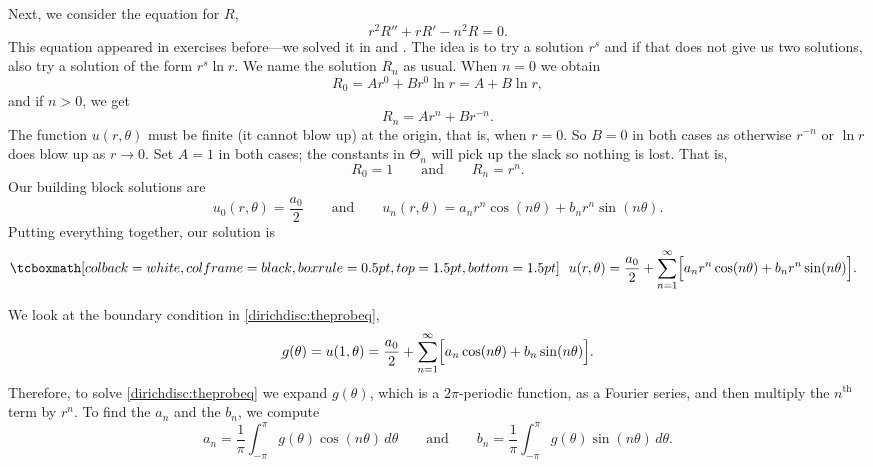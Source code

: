 Next, we consider the equation for $R$,
\begin{equation*}
r^2 R'' + r R' - n^2 R = 0.
\end{equation*}
This equation appeared in exercises before---we
solved it in 
and .  The idea is to try a solution
$r^s$ and if that does not give us two solutions, also try a solution of the form
$r^s \ln r$.  We name the solution $R_n$ as usual.  When $n=0$ we obtain
\begin{equation*}
R_0 = A r^0 + B r^0 \ln r = A + B \ln r ,
\end{equation*}
and if $n > 0$, we get
\begin{equation*}
R_n = A r^n + B r^{-n} .
\end{equation*}
The function $u(r,\theta)$ must be finite (it cannot blow up) at the origin, that is, when $r=0$.
So $B=0$ in both
cases as otherwise $r^{-n}$ or $\ln r$ does blow up as $r\to 0$.
Set $A=1$ in both cases; the constants in $\Theta_n$
will pick up the slack so nothing is lost.  That is,
\begin{equation*}
R_0 = 1
\qquad \text{and} \qquad
R_n = r^n .
\end{equation*}
Our building block solutions are
\begin{equation*}
u_0(r,\theta) = \frac{a_0}{2}
\qquad \text{and} \qquad
u_n(r,\theta) = a_n r^n \cos(n \theta) + b_n r^n \sin(n \theta) .
\end{equation*}
Putting everything together, our solution is
\begin{equation*}
\mybxbg{~~
u(r,\theta)
=
\frac{a_0}{2} +
\sum_{n=1}^\infty
\Bigl[
a_n r^n \cos(n \theta) + b_n r^n \sin(n \theta)
\Bigr]
.
~~}
\end{equation*}

We look at the boundary condition in \eqref{dirichdisc:theprobeq},
\begin{equation*}
g(\theta) = u(1,\theta)
=
\frac{a_0}{2} +
\sum_{n=1}^\infty
\Bigl[
a_n \cos(n \theta) + b_n \sin(n \theta)
\Bigr].
\end{equation*}
Therefore, to solve \eqref{dirichdisc:theprobeq}
we expand $g(\theta)$, which is 
a $2\pi$-periodic function, as a Fourier series, and then 
multiply the $n^{\text{th}}$ term by $r^n$.  To
find the $a_n$ and the $b_n$, we compute
\begin{equation*}
a_n =
\frac{1}{\pi} \int_{-\pi}^\pi g(\theta) \cos (n\theta) \, d\theta \qquad
\text{and} \qquad
b_n =
\frac{1}{\pi} \int_{-\pi}^\pi g(\theta) \sin (n\theta) \, d\theta.
\end{equation*}

